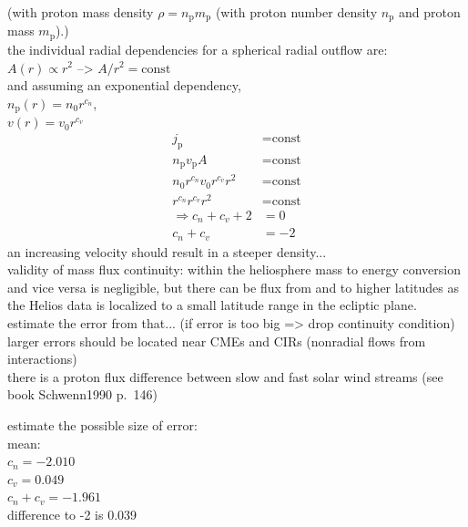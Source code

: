 (with proton mass density $\rho = n_\text{p} m_\text{p}$ (with proton number density $n_\text{p}$ and proton mass $m_\text{p}$).)\\

the individual radial dependencies for a spherical radial outflow are:\\
$A(r) \propto r^2$ --> $A/r^2 = \text{const}$\\
and assuming an exponential dependency,\\
$n_{\text{p}}(r) = n_0 r^{c_n}$,\\
$v(r) = v_0 r^{c_v}$\\
\begin{align}
	j_\text{p} &= \text{const}\\
	n_\text{p} v_\text{p} A &= \text{const}\\
	n_0 r^{c_n} v_0 r^{c_v} r^2 &= \text{const}\\
	r^{c_n} r^{c_v} r^2 &= \text{const}\\
	\Rightarrow c_n + c_v + 2 &= 0\\
	c_n + c_v &= -2
\end{align}
an increasing velocity should result in a steeper density...\\

validity of mass flux continuity: within the heliosphere mass to energy conversion and vice versa is negligible, but there can be flux from and to higher latitudes as the Helios data is localized to a small latitude range in the ecliptic plane.\\
estimate the error from that... (if error is too big => drop continuity condition)\\
larger errors should be located near CMEs and CIRs (nonradial flows from interactions)\\
there is a proton flux difference between slow and fast solar wind streams (see book Schwenn1990 p.~146)

estimate the possible size of error:\\
mean:\\
$c_n = -2.010$\\
$c_v = 0.049$\\
$c_n + c_v = -1.961$\\
difference to -2 is 0.039\\


